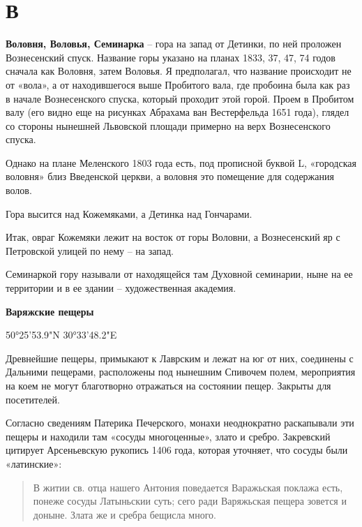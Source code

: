 \chapter*{В}

\textbf{Воловня, Воловья, Семинарка} – гора на запад от Детинки, по ней проложен Вознесенский спуск. Название горы указано на планах 1833, 37, 47, 74 годов сначала как Воловня, затем Воловья. Я предполагал, что название происходит не от «вола», а от находившегося выше Пробитого вала, где пробоина была как раз в начале Вознесенского спуска, который проходит этой горой. Проем в Пробитом валу (его видно еще на рисунках Абрахама ван Вестерфельда 1651 года), глядел со стороны нынешней Львовской площади примерно на верх Вознесенского спуска. 

Однако на плане Меленского 1803 года есть, под прописной буквой L, «городская воловня» близ Введенской церкви, а воловня это помещение для содержания волов. 

Гора высится над Кожемяками, а Детинка над Гончарами. 

Итак, овраг Кожемяки лежит на восток от горы Воловни, а Вознесенский яр с Петровской улицей по нему – на запад.

Семинаркой гору называли от находящейся там Духовной семинарии, ныне на ее территории и в ее здании – художественная академия.\\

\medskip

\textbf{Варяжские пещеры}

50°25'53.9"N 30°33'48.2"E

Древнейшие пещеры, примыкают к Лаврским и лежат на юг от них, соединены с Дальними пещерами, расположены под нынешним Спивочем полем, мероприятия на коем не могут благотворно отражаться на состоянии пещер. Закрыты для посетителей.

Согласно сведениям Патерика Печерского, монахи неоднократно раскапывали эти пещеры и находили там «сосуды многоценные», злато и сребро. Закревский цитирует Арсеньевскую рукопись 1406 года, которая уточняет, что сосуды были «латинские»:

\begin{quotation}
В житии св. отца нашего Антония поведается Варажьская поклажа есть, понеже сосуды Латыньскии суть; сего ради Варяжьская пещера зовется и доныне. Злата же и сребра бещисла много.
\end{quotation}

\medskip


